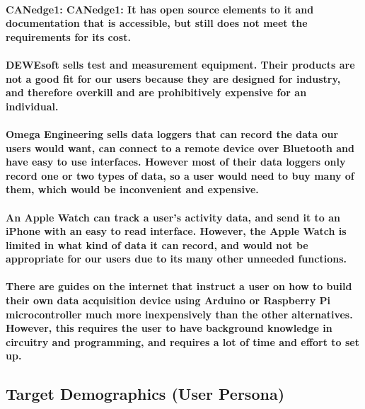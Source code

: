 \documentclass{article}
\begin{document}
\paragraph{
\textbf{CANedge1:} CANedge1: It has open source elements to it and
documentation that is accessible, but still does not meet the
requirements for its cost.
}

\paragraph{
DEWEsoft sells test and measurement equipment. Their products are not a
good fit for our users because they are designed for industry, and
therefore overkill and are prohibitively expensive for an individual.
}

\paragraph{
Omega Engineering sells data loggers that can record the data our users
would want, can connect to a remote device over Bluetooth and have easy
to use interfaces. However most of their data loggers only record one or
two types of data, so a user would need to buy many of them, which would
be inconvenient and expensive.
}

\paragraph{
An Apple Watch can track a user's activity data, and send it to an
iPhone with an easy to read interface. However, the Apple Watch is
limited in what kind of data it can record, and would not be appropriate
for our users due to its many other unneeded functions.
}

\paragraph{
There are guides on the internet that instruct a user on how to build
their own data acquisition device using Arduino or Raspberry Pi
microcontroller much more inexpensively than the other alternatives.
However, this requires the user to have background knowledge in
circuitry and programming, and requires a lot of time and effort to set
up.
}

\subsection{Target Demographics (User Persona)}
\label{target-demographics-user-persona}
\end{document}
